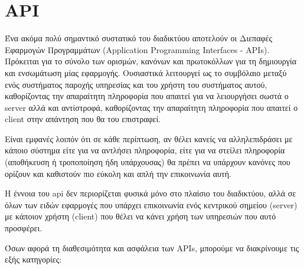 \section{API}
\label{section:api}

Ένα ακόμα πολύ σημαντικό συστατικό του διαδικτύου αποτελούν οι Διεπαφές Εφαρμογών Προγραμμάτων (Application Programming Interfaces - APIs).
Πρόκειται για το σύνολο των ορισμών, κανόνων και πρωτοκόλλων για τη δημιουργία και ενσωμάτωση μίας
εφαρμογής. Ουσιαστικά λειτουργεί ως το συμβόλαιο μεταξύ ενός συστήματος παροχής υπηρεσίας και του
χρήστη του συστήματος αυτού, καθορίζοντας την απαραίτητη πληροφορία που απαιτεί για να λειουργήσει σωστά
ο server αλλά και αντίστροφά, καθορίζοντας την απαραίτητη πληροφορία που απαιτεί ο client στην απάντηση
που θα του επιστραφεί.

Είναι εμφανές λοιπόν ότι σε κάθε περίπτωση, αν θέλει κανείς να αλληλεπιδράσει με κάποιο σύστημα
είτε για να αντλήσει πληροφορία, είτε για να στείλει πληροφορία (αποθήκευση ή τροποποίηση ήδη υπάρχουσας)
θα πρέπει να υπάρχουν κανόνες που ορίζουν και καθιστούν πιο εύκολη και απλή την επικοινωνία αυτή.

H έννοια του api δεν περιορίζεται φυσικά μόνο στο πλαίσιο του διαδικτύου, αλλά σε όλων των ειδών
εφαρμογές που υπάρχει επικοινωνία ενός κεντρικού σημείου (server) με κάποιον χρήστη (client) που θέλει να
κάνει χρήση των υπηρεσιών που αυτό προσφέρει.

Όσων αφορά τη διαθεσιμότητα και ασφάλεια των APIs, μπορούμε να διακρίνουμε τις εξής κατηγορίες:

